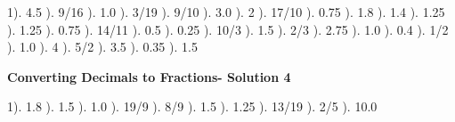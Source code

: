 \documentclass{article}%
\begin{document}
1). 4.5%
). 9/16%
). 1.0%
). 3/19%
). 9/10%
). 3.0%
). 2%
). 17/10%
). 0.75%
). 1.8%
). 1.4%
). 1.25%
). 1.25%
). 0.75%
). 14/11%
). 0.5%
). 0.25%
). 10/3%
). 1.5%
). 2/3%
). 2.75%
). 1.0%
). 0.4%
). 1/2%
). 1.0%
). 4%
). 5/2%
). 3.5%
). 0.35%
). 1.5%
\newline%
\newpage%
\large%
\begin{center}%
\textbf{Converting Decimals to Fractions- Solution 4}%
\newline%
\end{center} \normalsize%
1). 1.8%
). 1.5%
). 1.0%
). 19/9%
). 8/9%
). 1.5%
). 1.25%
). 13/19%
). 2/5%
). 10.0%
\newline%
\end{document}

